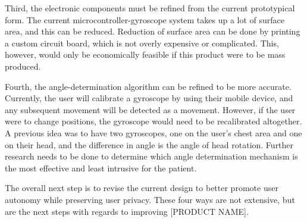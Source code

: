 Third, the electronic components must be refined from the current prototypical form. The current microcontroller-gyroscope system takes up a lot of surface area, and this can be reduced. Reduction of surface area can be done by printing a custom circuit board, which is not overly expensive or complicated. This, however, would only be economically feasible if this product were to be mass produced.

Fourth, the angle-determination algorithm can be refined to be more accurate. Currently, the user will calibrate a gyroscope by using their mobile device, and any subsequent movement will be detected as a movement. However, if the user were to change positions, the gyroscope would need to be recalibrated altogether. A previous idea was to have two gyroscopes, one on the user’s chest area and one on their head, and the difference in angle is the angle of head rotation. Further research needs to be done to determine which angle determination mechanism is the most effective and least intrusive for the patient.

The overall next step is to revise the current design to better promote user autonomy while preserving user privacy. These four ways are not extensive, but are the next steps with regards to improving [PRODUCT NAME].



